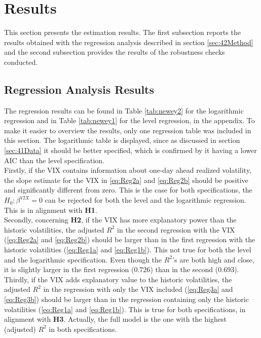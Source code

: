 
\section{Results}\label{sec:5Results}

This section presents the estimation results. The first subsection reports the results obtained with the regression analysis described in section \ref{sec:42Method} and the second subsection provides the results of the robustness checks conducted. 

\subsection{Regression Analysis Results}\label{sec:51Regression}
The regression results can be found in Table \ref{tab:newey2} for the logarithmic regression and in Table \ref{tab:newey1} for the level regression, in the appendix. To make it easier to overview the results, only one regression table was included in this section. The logarithmic table is displayed, since as discussed in section \ref{sec:41Data} it should be better specified, which is confirmed by it having a lower AIC than the level specification.\\
Firstly, if the VIX contains information about one-day ahead realized volatility, the slope estimate for the VIX in \ref{eq:Reg2a} and \ref{eq:Reg2b} should be positive and significantly different from zero. This is the case for both specifications, the $H_{0}: \beta^{VIX} = 0$ can be rejected for both the level and the logarithmic regression. This is in alignment with \textbf{\ac{H1}}.\\
Secondly, concerning \textbf{\ac{H2}}, if the VIX has more explanatory power than the historic volatilities, the adjusted $R^{2}$ in the second regression with the \ac{VIX} (\ref{eq:Reg2a} and \ref{eq:Reg2b}) should be larger than in the first regression with the historic volatilities (\ref{eq:Reg1a} and \ref{eq:Reg1b}). This not true for both the level and the logarithmic specification. Even though the $R^{2}$'s are both high and close, it is slightly larger in the first regression ($0.726$) than in the second ($0.693$).\\
Thirdly, if the VIX adds explanatory value to the historic volatilities, the adjusted $R^{2}$ in the regression with only the VIX included (\ref{eq:Reg3a} and \ref{eq:Reg3b}) should be larger than in the regression containing only the historic volatilities (\ref{eq:Reg1a} and \ref{eq:Reg1b}). This is true for both specifications, in alignment with \textbf{\ac{H3}}. Actually, the full model is the one with the highest (adjusted) $R^{2}$ in both specifications. \\
